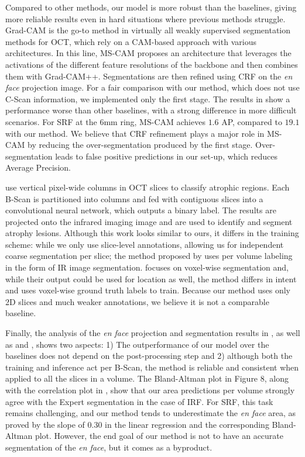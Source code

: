 Compared to other methods, our model is more robust than the baselines, giving more reliable results even in hard situations where previous methods struggle. Grad-CAM is the go-to method in virtually all weakly supervised segmentation methods for OCT, which rely on a CAM-based approach with various architectures. In this line, MS-CAM proposes an architecture that leverages the activations of the different feature resolutions of the backbone and then combines them with Grad-CAM++. Segmentations are then refined using CRF on the \textit{en face} projection image. For a fair comparison with our method, which does not use C-Scan information, we implemented only the first stage. The results in  show a performance worse than other baselines, with a strong difference in more difficult scenarios. For SRF at the 6mm ring, MS-CAM achieves $1.6$ AP, compared to $19.1$ with our method. We believe that CRF refinement plays a major role in MS-CAM by reducing the over-segmentation produced by the first stage. Over-segmentation leads to false positive predictions in our set-up, which reduces Average Precision.

 use vertical pixel-wide columns in OCT slices to classify atrophic regions. Each B-Scan is partitioned into columns and fed with contiguous slices into a convolutional neural network, which outputs a binary label. The results are projected onto the infrared imaging image and are used to identify and segment atrophy lesions. Although this work looks similar to ours, it differs in the training scheme: while we only use slice-level annotations, allowing us for independent coarse segmentation per slice; the method proposed by  uses per volume labeling in the form of IR image segmentation.
 focuses on voxel-wise segmentation and, while their output could be used for location as well, the method differs in intent and uses voxel-wise ground truth labels to train. Because our method uses only 2D slices and much weaker annotations, we believe it is not a comparable baseline.

Finally, the analysis of the \textit{en face} projection and segmentation results in , as well as  and , shows two aspects: 1) The outperformance of our model over the baselines does not depend on the post-processing step and 2) although both the training and inference act per B-Scan, the method is reliable and consistent when applied to all the slices in a volume. The Bland-Altman plot in Figure 8, along with the correlation plot in , show that our area predictions per volume strongly agree with the Expert segmentation in the case of IRF. For SRF, this task remains challenging, and our method tends to underestimate the \textit{en face} area, as proved by the slope of 0.30 in the linear regression and the corresponding Bland-Altman plot. However, the end goal of our method is not to have an accurate segmentation of the \textit{en face}, but it comes as a byproduct.

